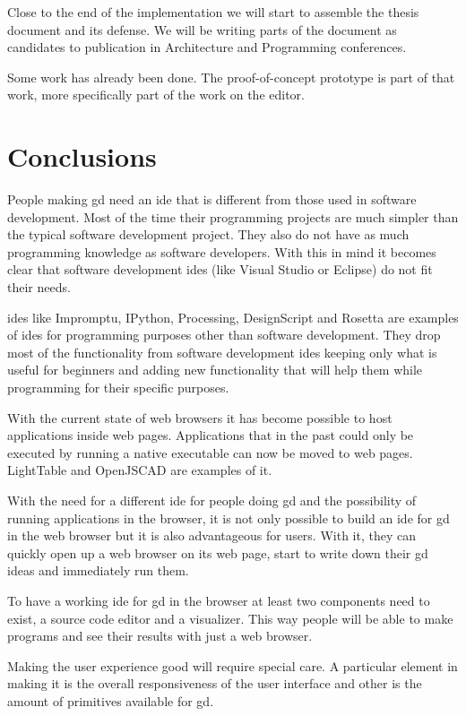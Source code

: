 \documentclass{./llncs2e/llncs}
\begin{document}
	Close to the end of the implementation we will start to assemble the thesis document and its defense.
	We will be writing parts of the document as candidates to publication in Architecture and Programming conferences.
	
	Some work has already been done.
	The proof-of-concept prototype is part of that work, more specifically part of the work on the editor.
		
	

\section{Conclusions}
	People making \ac{gd} need an \ac{ide} that is different from those used in software development. 
	Most of the time their programming projects are much simpler than the typical software development project.
	They also do not have as much programming knowledge as software developers.
	With this in mind it becomes clear that software development \acp{ide} (like Visual Studio or Eclipse) do not fit their needs.
	
	\ac{ide}s like Impromptu, IPython, Processing, DesignScript and Rosetta are examples of \ac{ide}s for programming purposes other than software development.
	They drop most of the functionality from software development \ac{ide}s  keeping only what is useful for beginners and adding new functionality that will help them while programming for their specific purposes.
	
	With the current state of web browsers it has become possible to host applications inside web pages. 
	Applications that in the past could only be executed by running a native executable can now be moved to web pages.
	LightTable and OpenJSCAD are examples of it.
	
	With the need for a different \ac{ide} for people doing \ac{gd} and the possibility of running applications in the browser, it is not only possible to build an \ac{ide} for \ac{gd} in the web browser but it is also advantageous for users.
	With it, they can quickly open up a web browser on its web page, start to write down their \ac{gd} ideas and immediately run them.
	
	To have a working \ac{ide} for \ac{gd} in the browser at least two components need to exist, a source code editor and a visualizer.
	This way people will be able to make programs and see their results with just a web browser.
	
	Making the user experience good will require special care.
	A particular element in making it is the overall responsiveness of the user interface and other is the amount of primitives available for \ac{gd}.
	
\end{document}
